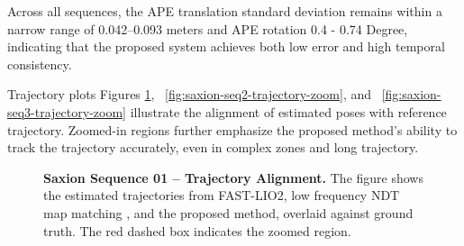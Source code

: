  Across all sequences, the APE translation standard deviation remains within a narrow range of 0.042–0.093 meters and  APE rotation 0.4 - 0.74 Degree, indicating that the proposed system achieves both low error and high temporal consistency. 
 
Trajectory plots Figures \ref{fig:saxion-seq1-trajectory-zoom},~ \ref{fig:saxion-seq2-trajectory-zoom}, and ~\ref{fig:saxion-seq3-trajectory-zoom}  illustrate the alignment of estimated poses with reference trajectory. Zoomed-in regions further emphasize the proposed method’s ability to track the trajectory accurately, even in complex zones and long trajectory.

\begin{figure}[H]
	\centering
	\caption[Saxion Sequence 01 – Trajectory Alignment with Zoomed Comparison]%
	{\textbf{Saxion Sequence 01 – Trajectory Alignment.} 
		The figure shows the estimated trajectories from FAST-LIO2, low frequency NDT map matching , and the proposed method, overlaid against ground truth. The red dashed box indicates the zoomed region.
	}
	\label{fig:saxion-seq1-trajectory-zoom}
\end{figure}


